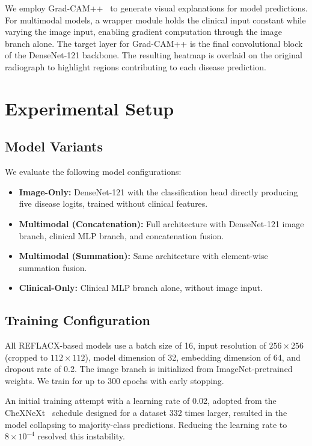 \documentclass[conference]{IEEEtran}
\begin{document}
We employ Grad-CAM++~\cite{chattopadhay2018gradcampp} to generate visual explanations for model predictions. For multimodal models, a wrapper module holds the clinical input constant while varying the image input, enabling gradient computation through the image branch alone. The target layer for Grad-CAM++ is the final convolutional block of the DenseNet-121 backbone. The resulting heatmap is overlaid on the original radiograph to highlight regions contributing to each disease prediction.

\section{Experimental Setup}\label{sec:experiments}

\subsection{Model Variants}

We evaluate the following model configurations:
\begin{itemize}
    \item \textbf{Image-Only:} DenseNet-121 with the classification head directly producing five disease logits, trained without clinical features.
    \item \textbf{Multimodal (Concatenation):} Full architecture with DenseNet-121 image branch, clinical MLP branch, and concatenation fusion.
    \item \textbf{Multimodal (Summation):} Same architecture with element-wise summation fusion.
    \item \textbf{Clinical-Only:} Clinical MLP branch alone, without image input.
\end{itemize}

\subsection{Training Configuration}

All REFLACX-based models use a batch size of 16, input resolution of $256 \times 256$ (cropped to $112 \times 112$), model dimension of 32, embedding dimension of 64, and dropout rate of 0.2. The image branch is initialized from ImageNet-pretrained weights. We train for up to 300 epochs with early stopping.

An initial training attempt with a learning rate of 0.02, adopted from the CheXNeXt~\cite{rajpurkar2018chexnext} schedule designed for a dataset 332 times larger, resulted in the model collapsing to majority-class predictions. Reducing the learning rate to $8 \times 10^{-4}$ resolved this instability.
\end{document}
